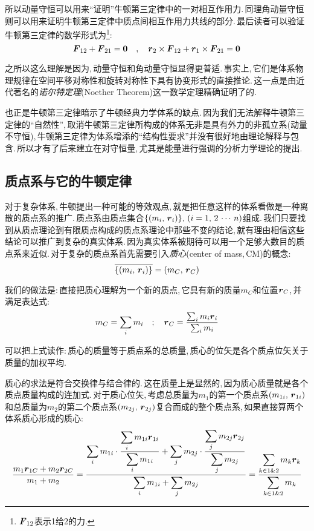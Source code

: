 所以动量守恒可以用来``证明''牛顿第三定律中的一对相互作用力.\,同理角动量守恒则可以用来证明牛顿第三定律中质点间相互作用力共线的部分.\,最后读者可以验证牛顿第三定律的数学形式为\footnote{$\boldsymbol{F}_{12}$表示1给2的力.}:
\[\boldsymbol{F}_{12}+\boldsymbol{F}_{21}=\boldsymbol{0}\quad,\quad \boldsymbol{r}_2\times\boldsymbol{F}_{12}+\boldsymbol{r}_1\times\boldsymbol{F}_{21}=\boldsymbol{0}\]

之所以这么理解是因为,\,动量守恒和角动量守恒显得更普适.\,事实上,\,它们是体系物理规律在空间平移对称性和旋转对称性下具有协变形式的直接推论.\,这一点是由近代著名的\emph{诺尔特定理}(Noether Theorem)这一数学定理精确证明了的.

也正是牛顿第三定律暗示了牛顿经典力学体系的缺点.\,因为我们无法解释牛顿第三定律的``自然性'',\,取消牛顿第三定律所构成的体系无非是具有外力的非孤立系(动量不守恒),\,牛顿第三定律为体系增添的``结构性要求''并没有很好地由理论解释与包含.\,所以才有了后来建立在对守恒量,\,尤其是能量进行强调的分析力学理论的提出.

\subsection{质点系与它的牛顿定律}
对于复杂体系,\,牛顿提出一种可能的等效观点,\,就是把任意这样的体系看做是一种离散的质点系的推广.\,质点系由质点集合$\{(m_i,\,\boldsymbol{r}_i)\},\,(i=1,\,2\,\cdots \,n)$组成.\,我们只要找到从质点理论到有限质点构成的质点系理论中那些不变的结论,\,就有理由相信这些结论可以推广到复杂的真实体系.\,因为真实体系被期待可以用一个足够大数目的质点系来近似.\,对于复杂的质点系首先需要引入\emph{质心}(center of mass,\,{\rm CM})的概念:
\[\overline{\{(m_i,\,\boldsymbol{r}_i)\}}=(m_C,\,\boldsymbol{r}_C)\]

我们的做法是:\,直接把质心理解为一个新的质点,\,它具有新的质量$m_C$和位置$\boldsymbol{r}_C$,\,并满足表达式:
\[m_C=\sum_i m_i\quad;\quad \boldsymbol{r}_C=\frac{\sum_i m_i\boldsymbol{r}_i}{\sum_i m_i}\]

可以把上式读作:\,质心的质量等于质点系的总质量,\,质心的位矢是各个质点位矢关于质量的加权平均.

质心的求法是符合交换律与结合律的.\,这在质量上是显然的,\,因为质心质量就是各个质点质量构成的连加式.\,对于质心位矢,\,考虑总质量为$m_1$的第一个质点系$(m_{1i},\,\boldsymbol{r}_{1i})$和总质量为$m_2$的第二个质点系$(m_{2j},\,\boldsymbol{r}_{2j})$复合而成的整个质点系,\,如果直接算两个体系质心形成的质心:
\[\frac{m_1\boldsymbol{r}_{1C}+m_2\boldsymbol{r}_{2C}}{m_1+m_2}=\frac{\displaystyle\sum_i m_{1i}\cdot \frac{\displaystyle\sum_{i} m_{1i}\boldsymbol{r}_{1i}}{\displaystyle\sum_i m_{1i}}+\displaystyle\sum_j m_{2j}\cdot\frac{\displaystyle\sum_{j} m_{2j}\boldsymbol{r}_{2j}}{\displaystyle\sum_{j} m_{2j}}}{\displaystyle\sum_i m_{1i}+\displaystyle\sum_j m_{2j}}=\frac{\displaystyle\sum_{k\in 1\& 2}m_k\boldsymbol{r}_k}{\displaystyle\sum_{k\in 1\& 2}m_k}\]

